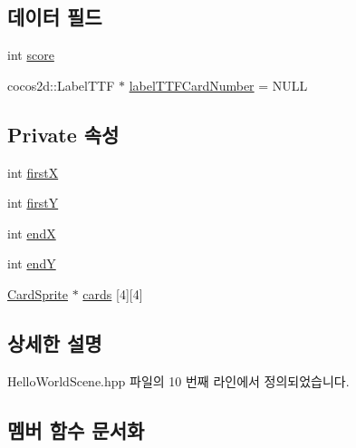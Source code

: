 \subsection*{데이터 필드}
\begin{DoxyCompactItemize}
\item 
int \hyperlink{classallenlsy_1_1game2048_1_1_hello_world_af5e35e78792c3fe4a2d4ab6266e9c6e1}{score}
\item 
cocos2d\+::\+Label\+T\+TF $\ast$ \hyperlink{classallenlsy_1_1game2048_1_1_hello_world_a08dbd0e2c7f6c6ac01f47e157d3b3911}{label\+T\+T\+F\+Card\+Number} = N\+U\+LL
\end{DoxyCompactItemize}
\subsection*{Private 속성}
\begin{DoxyCompactItemize}
\item 
int \hyperlink{classallenlsy_1_1game2048_1_1_hello_world_acba62073618cde47da3b85a856832e69}{firstX}
\item 
int \hyperlink{classallenlsy_1_1game2048_1_1_hello_world_a077f4900c33ee54cd90fa6112ce720bb}{firstY}
\item 
int \hyperlink{classallenlsy_1_1game2048_1_1_hello_world_acc494c0862f1af7a4d4bd684fd89a439}{endX}
\item 
int \hyperlink{classallenlsy_1_1game2048_1_1_hello_world_a8227878cbc4805dc2afcfba9707705f7}{endY}
\item 
\hyperlink{classallenlsy_1_1game2048_1_1_card_sprite}{Card\+Sprite} $\ast$ \hyperlink{classallenlsy_1_1game2048_1_1_hello_world_a1208d2de4b949d0b0f370b26f09fdf74}{cards} \mbox{[}4\mbox{]}\mbox{[}4\mbox{]}
\end{DoxyCompactItemize}


\subsection{상세한 설명}


Hello\+World\+Scene.\+hpp 파일의 10 번째 라인에서 정의되었습니다.



\subsection{멤버 함수 문서화}
\mbox{\label{classallenlsy_1_1game2048_1_1_hello_world_af1c795b6d174c1d6d6472e0fe703e648}} 
